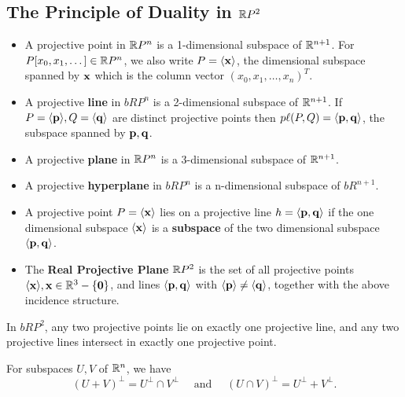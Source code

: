 \subsection{The Principle of Duality in \(\mathbb{R} P^2\)}

\begin{definition}
    \begin{itemize}
        \item A projective point in \(\mathbb{R} P^n\) is a 1-dimensional subspace of \(\mathbb{R}^{n + 1}\). For \(P[x_0, x_1, \dots] \in \mathbb{R} P^n\), we also write \(P = \langle \mathbf{x} \rangle\), the dimensional subspace spanned by \(\mathbf{x}\) which is the column vector \((x_0, x_1, \dots, x_n)^T\).
        \item A projective \textbf{line} in \(bR P^n\) is a 2-dimensional subspace of \(\mathbb{R}^{n + 1}\). If \(P = \langle \mathbf{p} \rangle, Q = \langle \mathbf{q} \rangle\) are distinct projective points then \(p\ell(P, Q) = \langle \mathbf{p}, \mathbf{q} \rangle\), the subspace spanned by \(\mathbf{p}, \mathbf{q}\).
        \item A projective \textbf{plane} in \(\mathbb{R} P^n\) is a 3-dimensional subspace of \(\mathbb{R}^{n + 1}\).
        \item A projective \textbf{hyperplane} in \(bR P^n\) is a n-dimensional subspace of \(bR^{n + 1}\).
        \item A projective point \(P = \langle \mathbf{x} \rangle\) lies on a projective line \(h = \langle \mathbf{p}, \mathbf{q} \rangle\) if the one dimensional subspace \(\langle \mathbf{x} \rangle\) is a \textbf{subspace} of the two dimensional subspace \(\langle \mathbf{p}, \mathbf{q} \rangle\).
        \item The \textbf{Real Projective Plane} \(\mathbb{R} P^2\) is the set of all projective points \(\langle \mathbf{x} \rangle, \mathbf{x} \in \mathbb{R}^3 - \{ \mathbf{0} \}\), and lines \(\langle \mathbf{p}, \mathbf{q} \rangle\) with \(\langle \mathbf{p} \rangle \neq \langle \mathbf{q} \rangle\), together with the above incidence structure.
    \end{itemize}
\end{definition}

\begin{proposition}
    In \(bR P^2\), any two projective points lie on exactly one projective line, and any two projective lines intersect in exactly one projective point.
\end{proposition}

\begin{lemma}
    For subspaces \(U, V\) of \(\mathbb{R}^n\), we have
    \[(U + V)^\perp = U^\perp \cap V^\perp \quad \text{ and } \quad (U \cap V)^\perp = U^\perp + V^\perp.\]
\end{lemma}

